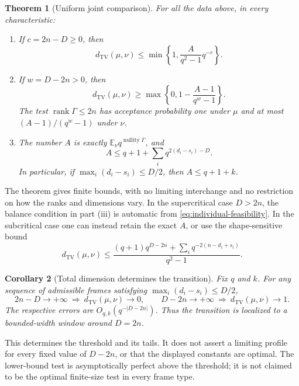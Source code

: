 \documentclass[11pt,letterpaper]{article}
\newtheorem{theorem}{Theorem}[section]
\newtheorem{corollary}[theorem]{Corollary}
\theoremstyle{definition}
\theoremstyle{remark}
\newcommand{\E}{\mathbb E}
\newcommand{\TV}{d_{\mathrm{TV}}}
\newcommand{\rank}{\operatorname{rank}}
\newcommand{\nul}{\operatorname{nullity}}
\begin{document}
\begin{theorem}[Uniform joint comparison]\label{thm:main}
For all the data above, in every characteristic:
\begin{enumerate}[label=(\roman*)]
\item If $c=2n-D\ge0$, then
\begin{equation}\label{eq:upper}
 \TV(\mu,\nu)\le\min\left\{1,\frac{A}{q^2-1}q^{-c}\right\}.
\end{equation}
\item If $w=D-2n>0$, then
\begin{equation}\label{eq:lower}
 \TV(\mu,\nu)\ge\max\left\{0,1-\frac{A-1}{q^w-1}\right\}.
\end{equation}
The test $\rank\Gamma\le2n$ has acceptance probability one under $\mu$ and at most $(A-1)/(q^w-1)$ under $\nu$.
\item The number $A$ is exactly $\E_\nu q^{\nul\Gamma}$, and
\begin{equation}\label{eq:A-bound}
 A\le q+1+\sum_iq^{2(d_i-s_i)-D}.
\end{equation}
In particular, if $\max_i(d_i-s_i)\le D/2$, then $A\le q+1+k$.
\end{enumerate}
\end{theorem}

The theorem gives finite bounds, with no limiting interchange and no restriction on how the ranks and dimensions vary. In the supercritical case $D>2n$, the balance condition in part (iii) is automatic from \eqref{eq:individual-feasibility}. In the subcritical case one can instead retain the exact $A$, or use the shape-sensitive bound
\begin{equation}\label{eq:shape-upper}
 \TV(\mu,\nu)\le
 \frac{(q+1)q^{D-2n}+\sum_iq^{-2(n-d_i+s_i)}}{q^2-1}.
\end{equation}

\begin{corollary}[Total dimension determines the transition]\label{cor:threshold}
Fix $q$ and $k$. For any sequence of admissible frames satisfying $\max_i(d_i-s_i)\le D/2$,
\[
 2n-D\longrightarrow+\infty\ \Longrightarrow\ \TV(\mu,\nu)\longrightarrow0,
 \qquad
 D-2n\longrightarrow+\infty\ \Longrightarrow\ \TV(\mu,\nu)\longrightarrow1.
\]
The respective errors are $O_{q,k}(q^{-|D-2n|})$. Thus the transition is localized to a bounded-width window around $D=2n$.
\end{corollary}

This determines the threshold and its tails. It does not assert a limiting profile for every fixed value of $D-2n$, or that the displayed constants are optimal. The lower-bound test is asymptotically perfect above the threshold; it is not claimed to be the optimal finite-size test in every frame type.
\end{document}
